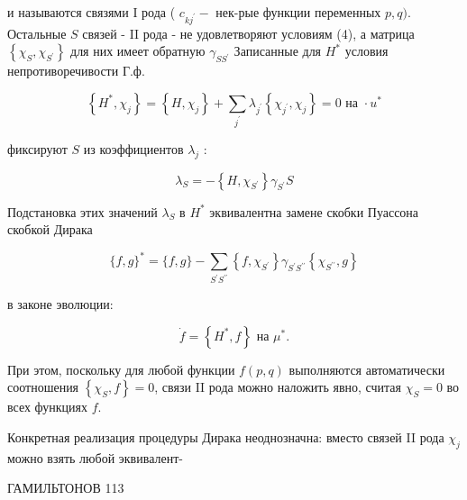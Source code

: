 \documentclass[10pt]{article}
\begin{document}
и называются связями I рода ( $c_{k j^{\prime}}-$ нек-рые функции переменных $p, q)$. Остальные $S$ связей - II рода - не удовлетворяют условиям (4), а матрица $\left\{\chi_{S}, \chi_{S^{\prime}}\right\}$ для них имеет обратную $\gamma_{S S^{\prime}}$ Записанные для $H^{*}$ условия непротиворечивости Г.ф.



\[

\left\{H^{*}, \chi_{j}\right\}=\left\{H, \chi_{j}\right\}+\sum_{j^{\prime}} \lambda_{j^{\prime}}\left\{\chi_{j^{\prime}}, \chi_{j}\right\}=0 \text { на } \cdot u^{*}

\]



фиксируют $S$ из коэффициентов $\lambda_{j}$ :



\[

\lambda_{S}=-\left\{H, \chi_{S^{\prime}}\right\} \gamma_{S^{\prime}} S

\]



Подстановка этих значений $\lambda_{S}$ в $H^{*}$ эквивалентна замене скобки Пуассона скобкой Дирака



\[

\{f, g\}^{*}=\{f, g\}-\sum_{S^{\prime} S^{\prime \prime}}\left\{f, \chi_{S^{\prime}}\right\} \gamma_{S^{\prime} S^{\prime \prime}}\left\{\chi_{S^{\prime \prime}}, g\right\}

\]



в законе эволюции:



\[

\dot{f}=\left\{H^{*}, f\right\} \text { на } \mu^{*} .

\]



При этом, поскольку для любой функции $f(p, q)$ выполняются автоматически соотношения $\left\{\chi_{S}, f\right\}=0$, связи II рода можно наложить явно, считая $\chi_{S}=0$ во всех функциях $f$.



Конкретная реализация процедуры Дирака неоднозначна: вместо связей II рода $\chi_{j}$ можно взять любой эквивалент-



ГАМИЛЬТОНОВ 113
\end{document}
